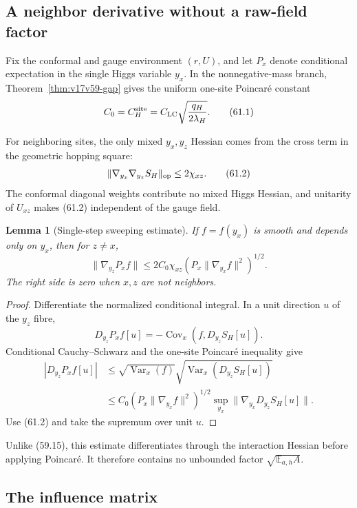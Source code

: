 \documentclass[11pt]{article}
\newtheorem{lemma}[theorem]{Lemma}
\theoremstyle{remark}
\begin{document}
\subsection{A neighbor derivative without a raw-field factor}

Fix the conformal and gauge environment \((r,U)\), and let \(P_x\)
denote conditional expectation in the single Higgs variable \(y_x\).
In the nonnegative-mass branch, Theorem~\ref{thm:v17v59-gap} gives the
uniform one-site Poincar\'e constant
\[
 C_0=C_H^{\rm site}
 =
 C_{\rm LC}\sqrt{\frac{q_H}{2\lambda_H}}.         \tag{61.1}
\]

For neighboring sites, the only mixed \(y_x,y_z\) Hessian comes from
the cross term in the geometric hopping square:
\[
 \|\nabla_{y_x}\nabla_{y_z}S_H\|_{\rm op}
 \leq2\chi_{xz}.                                  \tag{61.2}
\]
The conformal diagonal weights contribute no mixed Higgs Hessian, and
unitarity of \(U_{xz}\) makes (61.2) independent of the gauge field.

\begin{lemma}[Single-step sweeping estimate]
\label{lem:v17v61-sweep}
If \(f=f(y_x)\) is smooth and depends only on \(y_x\), then for
\(z\ne x\),
\[
\boxed{
 \|\nabla_{y_z}P_xf\|
 \leq
 2C_0\chi_{xz}
 \left(P_x\|\nabla_{y_x}f\|^2\right)^{1/2}.}      \tag{61.3}
\]
The right side is zero when \(x,z\) are not neighbors.
\end{lemma}

\begin{proof}
Differentiate the normalized conditional integral.  In a unit
direction \(u\) of the \(y_z\) fibre,
\[
 D_{y_z}P_xf[u]
 =
 -\operatorname{Cov}_x
 (f,D_{y_z}S_H[u]).                               \tag{61.4}
\]
Conditional Cauchy--Schwarz and the one-site Poincar\'e inequality
give
\[
\begin{aligned}
 |D_{y_z}P_xf[u]|
 &\leq
 \sqrt{\operatorname{Var}_x(f)}
 \sqrt{\operatorname{Var}_x(D_{y_z}S_H[u])}\\
 &\leq
 C_0
 \left(P_x\|\nabla_{y_x}f\|^2\right)^{1/2}
 \sup_{y_x}
 \|\nabla_{y_x}D_{y_z}S_H[u]\|.                  \tag{61.5}
\end{aligned}
\]
Use (61.2) and take the supremum over unit \(u\).
\end{proof}

Unlike (59.15), this estimate differentiates through the interaction
Hessian before applying Poincar\'e.  It therefore contains no
unbounded factor \(\sqrt{\mathbb E_{a,h}A}\).

\subsection{The influence matrix}
\end{document}
